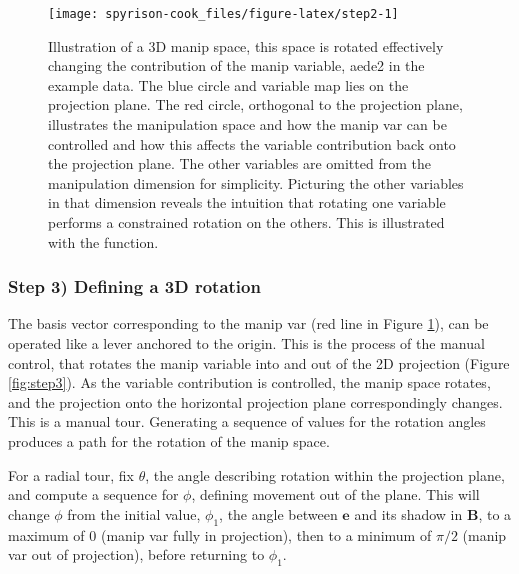 \begin{Schunk}
\begin{figure}

{\centering \texttt{[image: spyrison-cook\_files/figure-latex/step2-1]} 

}

\caption[Illustration of a 3D manip space, this space is rotated effectively changing the contribution of the manip variable, aede2 in the example data]{Illustration of a 3D manip space, this space is rotated effectively changing the contribution of the manip variable, aede2 in the example data. The blue circle and variable map lies on the projection plane. The red circle, orthogonal to the projection plane, illustrates the manipulation space and how the manip var can be controlled and how this affects the variable contribution back onto the projection plane. The other variables are omitted from the manipulation dimension for simplicity. Picturing the other variables in that dimension reveals the intuition that rotating one variable performs a constrained rotation on the others. This is illustrated with the  function.}\label{fig:step2}
\end{figure}
\end{Schunk}

\hypertarget{step-3-defining-a-3d-rotation}{%
\subsubsection{Step 3) Defining a 3D
rotation}\label{step-3-defining-a-3d-rotation}}

The basis vector corresponding to the manip var (red line in Figure
\ref{fig:step2}), can be operated like a lever anchored to the origin.
This is the process of the manual control, that rotates the manip
variable into and out of the 2D projection (Figure \ref{fig:step3}). As
the variable contribution is controlled, the manip space rotates, and
the projection onto the horizontal projection plane correspondingly
changes. This is a manual tour. Generating a sequence of values for the
rotation angles produces a path for the rotation of the manip space.

For a radial tour, fix \(\theta\), the angle describing rotation within
the projection plane, and compute a sequence for \(\phi\), defining
movement out of the plane. This will change \(\phi\) from the initial
value, \(\phi_1\), the angle between \(\textbf{e}\) and its shadow in
\(\textbf{B}\), to a maximum of \(0\) (manip var fully in projection),
then to a minimum of \(\pi/2\) (manip var out of projection), before
returning to \(\phi_1\).

